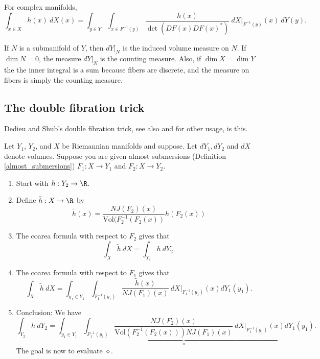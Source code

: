 \documentclass[10pt]{amsart}
\numberwithin{equation}{section}     %
\begin{document}
\begin{remark}
For complex manifolds, $$\int_{x \in X} h(x) \ dX(x) = \int_{y \in Y} \int_{x \in F^{-1}(y)} \frac{h(x)}{\det (DF(x) DF(x)^*)} \ dX|_{F^{-1}(y)}(x) \ dY(y).$$ 
\end{remark}

\begin{remark}
    If $N$ is a submanifold of $Y$, then $dY|_N$ is the induced volume measure on $N$. If $\dim N = 0$, the measure $dY|_N$ is the counting measure. Also, if $\dim X = \dim Y$ the the inner integral is a sum because fibers are discrete, and the measure on fibers is simply the counting measure. 
\end{remark}

\subsection{The double fibration trick}
Dedieu and Shub's double fibration trick, see also \cite{kodat2024average} and \cite{armentanorandom} for other usage, is this.

Let $Y_1$, $Y_2$, and $X$ be Riemannian manifolds and suppose. Let $dY_1,dY_2$ and $dX$ denote volumes. Suppose you are given almost submersions (Definition \ref{almost_submersions}) $F_1:X \to Y_1$ and $F_2: X \to Y_2$. 

\begin{enumerate}
    \item Start with $h: Y_2 \to \R$.
    \item Define $\tilde{h} : X \to \R$ by $$\tilde{h}(x) = \frac{NJ(F_2)(x)}{\mathrm{Vol} (F_2^{-1}(F_2(x))}h(F_2(x))$$
    \item The coarea formula with respect to $F_2$ gives that $$\int_X \tilde{h} \ dX = \int_{Y_2} h \ dY_2. $$
    \item The coarea formula with respect to $F_1$ gives that $$\int_X \tilde{h} \ dX = \int_{y_1 \in Y_1} \int_{F_1^{-1}(y_1)} \frac{\tilde{h}(x)}{NJ(F_1)(x)}  \ dX|_{F_1^{-1}(y_1)}(x)dY_1(y_1).$$
    \item Conclusion: We have $$\int_{Y_2} h \ dY_2 =  \int_{y_1 \in Y_1} \underbrace{\int_{F_1^{-1}(y_1)} \frac{NJ(F_2)(x)}{\mathrm{Vol}(F_2^{-1}(F_2(x)))NJ(F_1)(x)}  \ dX|_{F_1^{-1}(y_1)}(x)}_{\diamond}dY_1(y_1).$$
    The goal is now to evaluate $\diamond$.
\end{enumerate}
\end{document}
